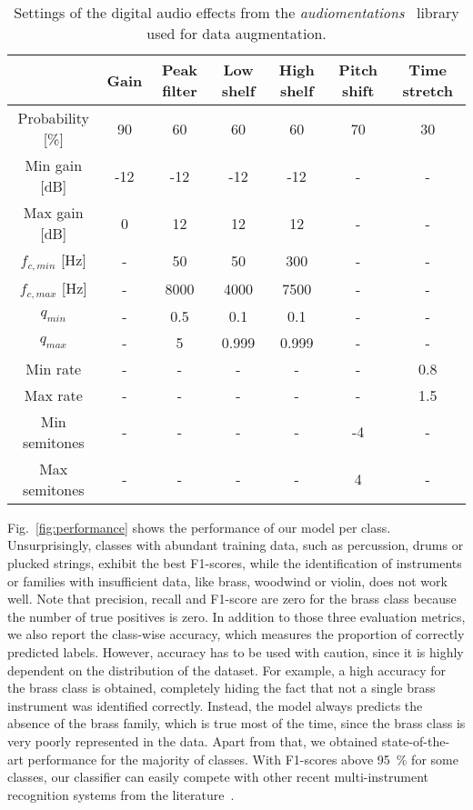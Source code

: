 \begin{table}[]
	\centering
	\begin{tabular}{c|c|c|c|c|c|c}
		& Gain & Peak filter & Low shelf & High shelf & Pitch shift & Time stretch \\ \hline
		Probability [\%]	& 90 & 60 & 60 & 60 & 70 & 30 \\ \hline
		Min gain [dB] &   -12   &  -12  & -12 & -12 & - & - \\ \hline
		Max gain [dB] &    0  & 12  & 12 & 12 & - & - \\ \hline
		$f_{c,min}$ [Hz] &  -  &  50 & 50 & 300 & - & - \\ \hline
		$f_{c,max}$	[Hz]&  -    & 8000 & 4000 & 7500 & - & - \\ \hline
		$q_{min}$ 	&   -   &  0.5 & 0.1 & 0.1 & - &  -\\ \hline
		$q_{max}$	&   -   &  5 & 0.999 & 0.999 & - & - \\ \hline
		Min rate	&   -   &  - & - & - & - & 0.8 \\ \hline
		Max rate	&   -   &   - & - & - & - & 1.5 \\ \hline
		Min semitones	&   -   &  -  & - & - & -4 & - \\ \hline
		Max semitones	&   -   &  - & - & - & 4 & - \\
	\end{tabular}
	\caption{Settings of the digital audio effects from the \textit{audiomentations}~\cite{audiomentations} library used for data augmentation.}
	\label{tab:augmentation-hyperparam}
\end{table}

Fig.~\ref{fig:performance} shows the performance of our model per class. Unsurprisingly, classes with abundant training data, such as percussion, drums or plucked strings, exhibit the best F1-scores, while the identification of instruments or families with insufficient data, like brass, woodwind or violin, does not work well. Note that precision, recall and F1-score are zero for the brass class because the number of true positives is zero. In addition to those three evaluation metrics, we also report the class-wise accuracy, which measures the proportion of correctly predicted labels. However, accuracy has to be used with caution, since it is highly dependent on the distribution of the dataset. For example, a high accuracy for the brass class is obtained, completely hiding the fact that not a single brass instrument was identified correctly. Instead, the model always predicts the absence of the brass family, which is true most of the time, since the brass class is very poorly represented in the data. Apart from that, we obtained state-of-the-art performance for the majority of classes. With F1-scores above \SI{95}{\percent} for some classes, our classifier can easily compete with other recent multi-instrument recognition systems from the literature~\cite{gururani2019attention, seipel2018music, kadandale2018musical}.




